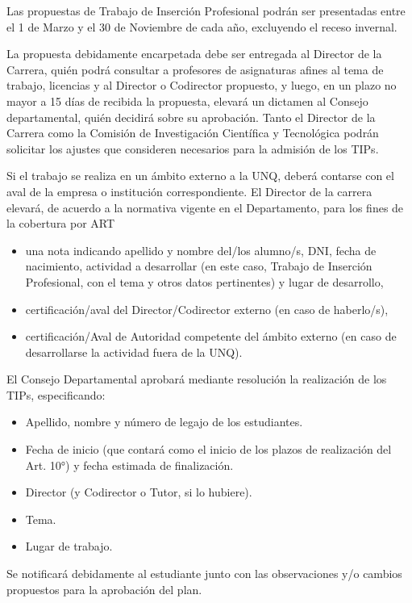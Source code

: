 \articulo Las propuestas de Trabajo de Inserción Profesional podrán ser
presentadas entre el 1 de Marzo y el 30 de Noviembre de cada año, excluyendo el
receso invernal.

\articulo La propuesta debidamente encarpetada debe ser entregada al
Director de la Carrera, quién podrá consultar a profesores de asignaturas afines al
tema de trabajo, licencias y al Director o Codirector propuesto, y luego, en un
plazo no mayor a 15 días de recibida la propuesta, elevará un dictamen al Consejo departamental,
quién decidirá sobre su aprobación. Tanto el Director de la Carrera como la Comisión de Investigación
Científica y Tecnológica podrán solicitar los ajustes que consideren necesarios para la
admisión de los TIPs. 

\articulo Si el trabajo se realiza en un ámbito externo a la UNQ, deberá
contarse con el aval de la empresa o institución correspondiente. El Director de la
carrera elevará, de acuerdo a la normativa vigente en el Departamento, para los fines
de la cobertura por ART

\begin{itemize}
 \item una nota indicando apellido y nombre del/los alumno/s, DNI, fecha
 de nacimiento, actividad a desarrollar (en este caso, Trabajo de
 Inserción Profesional, con el tema y otros datos pertinentes) y lugar
 de desarrollo,
 \item certificación/aval del Director/Codirector externo (en caso de
 haberlo/s),
 \item certificación/Aval de Autoridad competente del ámbito externo (en
 caso de desarrollarse la actividad fuera de la UNQ).
\end{itemize}


\articulo El Consejo Departamental aprobará mediante resolución la
realización de los TIPs, especificando:
\begin{itemize}
 \item Apellido, nombre y número de legajo de los estudiantes.
 \item Fecha de inicio (que contará como el inicio de los plazos de
 realización del Art. 10°) y fecha estimada de finalización.
 \item Director (y Codirector o Tutor, si lo hubiere).
 \item Tema.
 \item Lugar de trabajo.
\end{itemize}

Se notificará debidamente al estudiante junto con las observaciones y/o cambios
propuestos para la aprobación del plan.

